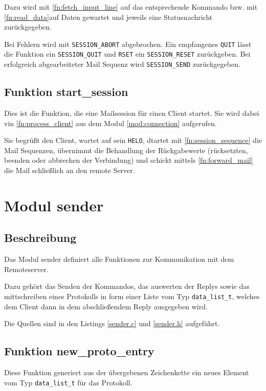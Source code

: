 \documentclass[pdftex,final,a4paper,10pt,notitlepage,halfparskip]{scrreprt}
\begin{document}
Dazu wird mit \ref{fn:fetch_input_line} auf das entsprechende Kommando bzw. mit \ref{fn:read_data}auf Daten gewartet und jeweils eine Statusnachricht zurückgegeben.

Bei Fehlern wird mit \texttt{SESSION\_ABORT} abgebrochen. Ein empfangenes \texttt{QUIT} lässt die Funktion ein \texttt{SESSION\_QUIT} und \texttt{RSET} ein \texttt{SESSION\_RESET} zurückgeben. Bei erfolgreich abgearbeiteter Mail Sequenz wird \texttt{SESSION\_SEND} zurückgegeben.

\subsection{Funktion start\_session}\label{fn:start_session}
Dies ist die Funktion, die eine Mailsession für einen Client startet. Sie wird dabei vin \ref{fn:process_client} aus dem Modul \ref{mod:connection} aufgerufen.

Sie begrüßt den Client, wartet auf sein \texttt{HELO}, dtartet mit \ref{fn:session_sequence} die Mail Sequenzen, übernimmt die Behandlung der Rückgabewerte (rücksetzten, beenden oder abbrechen der Verbindung) und schickt mittels \ref{fn:forward_mail} die Mail schließlich an den remote Server.



\section{Modul sender}\label{mod:sender}
\subsection{Beschreibung}
Das Modul sender definiert alle Funktionen zur Kommunikation mit dem Remoteserver.

Dazu gehört das Senden der Kommandos, das auswerten der Replys sowie das mittschreiben eines Protokolls in form einer Liste vom Typ \texttt{data\_list\_t}, welches dem Client dann in dem abschließendem Reply ausgegeben wird.

Die Quellen sind in den Listings \ref{sender.c} und \ref{sender.h} aufgeführt.

\subsection{Funktion new\_proto\_entry}\label{new_proto_entry}
Diese Funktion generiert aus der übergebenen Zeichenkette ein neues Element vom Typ \texttt{data\_list\_t} für das Protokoll.
\end{document}
